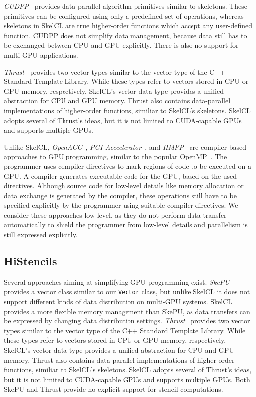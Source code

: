 \emph{CUDPP}~\cite{SenguptaHZO07} provides data-parallel algorithm primitives similar to skeletons.
These primitives can be configured using only a predefined set of operations, whereas
skeletons in SkelCL are true higher-order functions which accept any user-defined function.
CUDPP does not simplify data management, because data still has to be exchanged between CPU and GPU explicitly.
There is also no support for multi-GPU applications.

\emph{Thrust}~\cite{BellHo2011} provides two vector types similar to the vector type of the C++ Standard Template Library.
While these types refer to vectors stored in CPU or GPU memory, respectively, SkelCL's vector data type provides a unified abstraction for CPU and GPU memory.
Thrust also contains data-parallel implementations of higher-order functions, similiar to SkelCL's skeletons.
SkelCL adopts several of Thrust's ideas, but it is not limited to CUDA-capable GPUs and supports multiple GPUs.

Unlike SkelCL, \emph{OpenACC}~\cite{OpenACC}, \emph{PGI Acccelerator}~\cite{PGI-10}, and \emph{HMPP}~\cite{HMPP-09} are compiler-based approaches to GPU programming, similar to the popular OpenMP~\cite{OpenMP-08}.
The programmer uses compiler directives to mark regions of code to be executed on a GPU.
A compiler generates executable code for the GPU, based on the used directives.
Although source code for low-level details like memory allocation or data exchange is generated by the compiler, these operations still have to be specified explicitly by the programmer using suitable compiler directives.
We consider these approaches low-level, as they do not perform data transfer automatically to shield the programmer from low-level details and parallelism is still expressed explicitly.

\subsection{HiStencils}
Several approaches aiming at simplifying GPU programming exist.
\emph{SkePU}~\cite{EnmyrenKe10} provides a vector class similar to our \texttt{Vector} class, but unlike SkelCL it does not support different kinds of data distribution on multi-GPU systems.
SkelCL provides a more flexible memory management than SkePU, as data transfers can be expressed by changing data distribution settings.
\emph{Thrust}~\cite{BellHo2011} provides two vector types similar to the vector type of the C++ Standard Template Library.
While these types refer to vectors stored in CPU or GPU memory, respectively, SkelCL's vector data type provides a unified abstraction for CPU and GPU memory.
Thrust also contains data-parallel implementations of higher-order functions, similiar to SkelCL's skeletons.
SkelCL adopts several of Thrust's ideas, but it is not limited to CUDA-capable GPUs and supports multiple GPUs.
Both SkePU and Thrust provide no explicit support for stencil computations.

